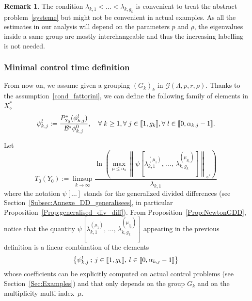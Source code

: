 \documentclass[10pt]{amsart}
\theoremstyle{definition}\newtheorem{defi}[theo]{Definition}\newtheorem{rema}[theo]{Remark}\newtheorem{exam}[theo]{Example}\newtheorem{exem}[theo]{Example}\newtheorem{nota}[theo]{Notation}
\newcommand{\llbracket}{\mathopen{[\mkern -2.7mu[}}
\newcommand{\rrbracket}{\mathclose{]\mkern -2.7mu]}}
\newcommand{\inter}[2]{\llbracket #1,#2 \rrbracket}
\newcommand\Bs{\mathcal{B}^*}
\newcommand{\Xalphas}{X_\diamond^*}
\newcommand{\Fzp}{Y_0}
\newcommand{\normeF}[1]{\left\| #1 \right\|_{\diamond^*}}
\newcommand{\PFa}{P_{\Fzp}^*}
\newcommand{\n}{g}
\let\oldforall\forall
\renewcommand*{\forall}{\mathrel{\oldforall}}
\begin{document}
\begin{rema}
The condition $\lambda_{k,1} < \dots < \lambda_{k,g_k}$ is convenient to treat the abstract problem~\eqref{systeme} but might not be convenient in actual examples. As all the estimates in our analysis will depend on the parameters $p$ and $\rho$, the eigenvalues inside a same group are mostly interchangeable and thus the increasing labelling is not needed.
\end{rema}


\subsubsection{Minimal control time definition}

From now on, we assume given a grouping $(G_k)_k$ in $\mathcal{G}(\Lambda,p,r,\rho)$. Thanks to the assumption~\eqref{cond_fattorini}, we can define the following family of elements in $\Xalphas$
\begin{equation}\label{Def_Psik}
\psi_{k,j}^l := \frac{\PFa(\phi_{k,j}^l)}{\Bs \phi_{k,j}^0}, \quad \forall k\geq 1, \forall j\in \inter{1}{\n_k}, \forall l \in \inter{0}{\alpha_{k,j}-1}.
\end{equation}



Let
\begin{equation}\label{Def:T0_DDgeneralisees}
T_0(\Fzp) := \limsup_{k\to \infty} \frac{\ln \left(\max \limits_{\mu\leq \alpha_k} \normeF{\psi\left[\lambda_{k,1}^{(\mu_1)},\,\dotsc,\,\lambda_{k,\n_k}^{(\mu_{\n_k})}\right] } \right)}{\lambda_{k,1}}
\end{equation}
where the notation $\psi[\dotsc]$ stands for the generalized divided differences (see Section~\ref{Subsec:Annexe_DD_generalisees}, in particular Proposition~\ref{Prop:generalised_div_diff}). From Proposition~\ref{Prop:NewtonGDD}, notice that the quantity $\psi[\lambda_{k,1}^{(\mu_1)},\,\dotsc,\,\lambda_{k,\n_k}^{(\mu_{\n_k})}]$ appearing in the previous definition is a linear combination of the elements
\[
\left\{ \psi_{k,j}^l \: ; \: j \in \inter{1}{\n_k}, \: l \in \inter{0}{\alpha_{k,j}-1} \right\}
\]
whose coefficients can be explicitly computed on actual control problems (see Section~\ref{Sec:Examples}) and that only depends on the group $G_k$ and on the multiplicity multi-index~$\mu$.
\end{document}
